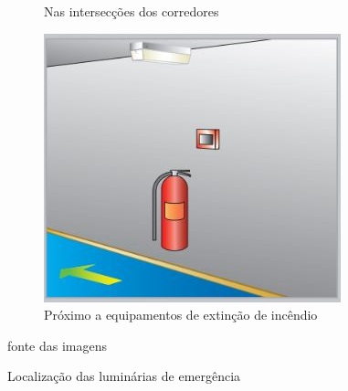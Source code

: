 \begin{figure}[H]
\begin{subfigure}[b]{0.3\textwidth}
			\caption{Nas intersecções dos corredores}
			\label{fig: style 1 image h}
		\end{subfigure}
		\hfill
		\begin{subfigure}[b]{0.3\textwidth}
			\centering
			\includegraphics[width=\textwidth]{Figures/3. Lighting/light-safety9.jpg}
			\caption{Próximo a equipamentos de extinção de incêndio}
			\label{fig: style 1 image y}
		\end{subfigure}
		\caption{Localização das luminárias de emergência} fonte das imagens \cite{eaton2013} 
		\label{fig: safety-luminarires-places}
	\end{figure}
